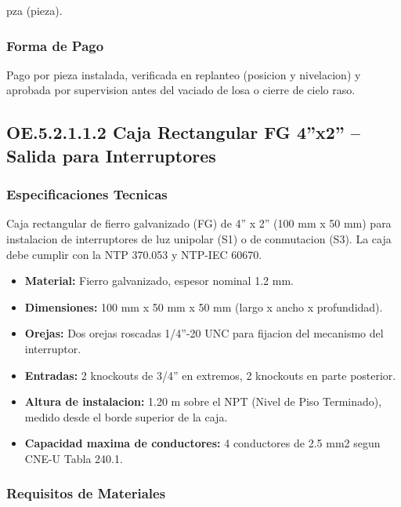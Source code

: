 pza (pieza).

\subsubsection{Forma de Pago}

Pago por pieza instalada, verificada en replanteo (posicion y nivelacion) y aprobada por supervision antes del vaciado de losa o cierre de cielo raso.

\subsection{OE.5.2.1.1.2 Caja Rectangular FG 4''x2'' -- Salida para Interruptores}

\subsubsection{Especificaciones Tecnicas}

Caja rectangular de fierro galvanizado (FG) de 4'' x 2'' (100 mm x 50 mm) para instalacion de interruptores de luz unipolar (S1) o de conmutacion (S3). La caja debe cumplir con la NTP 370.053 y NTP-IEC 60670.

\begin{itemize}[nosep]
  \item \textbf{Material:} Fierro galvanizado, espesor nominal 1.2 mm.
  \item \textbf{Dimensiones:} 100 mm x 50 mm x 50 mm (largo x ancho x profundidad).
  \item \textbf{Orejas:} Dos orejas roscadas 1/4''-20 UNC para fijacion del mecanismo del interruptor.
  \item \textbf{Entradas:} 2 knockouts de 3/4'' en extremos, 2 knockouts en parte posterior.
  \item \textbf{Altura de instalacion:} 1.20 m sobre el NPT (Nivel de Piso Terminado), medido desde el borde superior de la caja.
  \item \textbf{Capacidad maxima de conductores:} 4 conductores de 2.5 mm2 segun CNE-U Tabla 240.1.
\end{itemize}

\subsubsection{Requisitos de Materiales}

